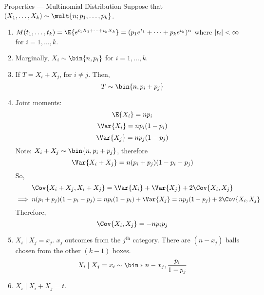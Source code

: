 \begin{Proposition}{Properties --- Multinomial Distribution}{}
    Suppose that $ (X_1,\ldots,X_k) \sim \mult{n;p_1,\ldots,p_k} $.
    \begin{enumerate}[label=(\arabic*)]
        \item $ M(t_1,\ldots,t_k)=\E{e^{t_1 X_1+\cdots+t_k X_k}}=
                  (p_1e^{t_1}+\cdots+p_k e^{t_k})^n $
              where $ \lvert t_i\rvert<\infty $ for $ i=1,\ldots,k $.
        \item Marginally, $ X_i \sim \bin{n,p_i} $
              for $ i=1,\ldots,k $.
        \item If $ T=X_i+X_j $, for $ i\neq j $. Then,
              \[ T \sim \bin{n,p_i+p_j} \]
        \item Joint moments:
              \[ \E{X_i}=n p_i \]
              \[ \Var{X_i}=np_i(1-p_i) \]
              \[ \Var{X_j}=np_j(1-p_j) \]
              Note: $ X_i+X_j \sim \bin{n,p_i+p_j} $, therefore
              \[ \Var{X_i+X_j}=n(p_i+p_j)(1-p_i-p_j) \]
              So,
              \[ \Cov{X_i+X_j,X_i+X_j}=\Var{X_i}+\Var{X_j}+2\Cov{X_i,X_j} \]
              \[ \implies n(p_i+p_j)(1-p_i-p_j)=np_i(1-p_i)+\Var{X_j}=np_j(1-p_j)
                  +2\Cov{X_i,X_j} \]
              Therefore,
              \[ \Cov{X_i,X_j}=-n p_i p_j \]
        \item $ X_i\mid X_j=x_j $. $ x_j $ outcomes
              from the $ j^{\text{th}} $ category. There are
              $ (n-x_j) $ balls chosen from the other $ (k-1) $ boxes.
              \[ X_i\mid X_j=x_i \sim \bin*{n-x_j,
                      \frac{p_i}{1-p_j}} \]
        \item $ X_i\mid X_i+X_j=t $.
    \end{enumerate}
\end{Proposition}

